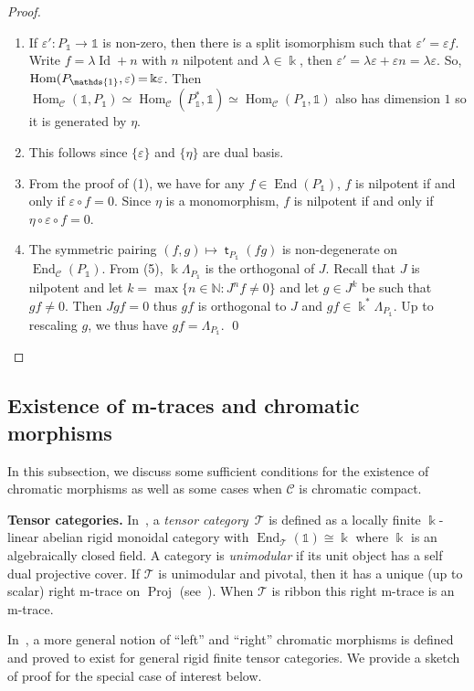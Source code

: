 \documentclass[10pt,a4paper]{amsart}
\numberwithin{equation}{section}
\newcommand{\Proj}{\operatorname{Proj}}
\newcommand{\tto}{\xrightarrow}
\numberwithin{theorem}{section}
\numberwithin{proposition}{section}
\numberwithin{definition}{section}
\numberwithin{lemma}{section}
\numberwithin{corollary}{section}
\numberwithin{remark}{section}
\numberwithin{example}{section}
\newcommand{\cat}{\mathcal{C}}
\newcommand{\ttt}{\mathcal{T}}
\newcommand{\N}{\ensuremath{\mathbb{N}}}
\newcommand{\End}{\operatorname{End}}
\newcommand{\Hom}{\operatorname{Hom}}
\newcommand{\unit}{\ensuremath{\mathds{1}}}
\newcommand{\Id}{\operatorname{Id}}
\newcommand{\FK}{{\Bbbk}}
\newcommand{\ve}{\varepsilon}
\newcommand{\mt}{{\operatorname{\mathsf{t}}}}
\begin{document}
\begin{proof}
\begin{enumerate}
 \item If $\ve'\colon P_\unit\to\unit$ is non-zero, then there is a split
 isomorphism \smash{$P_\unit\tto f P_\unit$} such that ${\ve'=\ve f}$. Write
 $f=\lambda\Id+n$ with $n$ nilpotent and $\lambda\in\FK$, then
 $\ve'=\lambda\ve+\ve n=\lambda\ve$. So,
 ${\Hom(P_\unit,\ve)\hspace{-0.9pt}=\hspace{-0.9pt}\FK\ve}$. Then
 $\Hom_\cat(\unit,P_\unit)\simeq\Hom_\cat(P_\unit^*,\unit)\simeq\Hom_\cat(P_\unit,\unit)$ also
 has dimension $1$ so it is generated by $\eta$.
 \item This follows since $\{\ve\}$ and $\{\eta\}$ are dual basis.
 \item From the proof of (1), we have for any
 $f\in\End(P_\unit)$, $f$ is nilpotent if and only if
 $\ve\circ f=0$. Since $\eta$ is a monomorphism, $f$ is nilpotent
 if and only if $\eta\circ \ve\circ f=0$.
 \item The symmetric pairing $(f,g)\mapsto \mt_{P_\unit}(fg)$ is
 non-degenerate on $\End_\cat(P_\unit)$. From (5),
 $\FK \Lambda_{P_\unit}$ is the orthogonal of $J$. Recall that $J$
 is nilpotent and let $k=\max\{n\in\N:J^nf\neq0\}$ and let
 $g\in J^k$ be such that $gf\neq0$. Then $Jgf=0$ thus $gf$ is
 orthogonal to $J$ and $gf\in\FK^* \Lambda_{P_\unit}$. Up to
 rescaling $g$, we thus have $gf=\Lambda_{P_\unit}$.
\hfill\qed
\end{enumerate}
\renewcommand{\qed}{}
\end{proof}

\subsection{Existence of m-traces and chromatic morphisms}\label{ss:coend}

 In this subsection, we discuss some sufficient conditions for the existence of chromatic morphisms as well as some cases when $\cat$ is chromatic compact.

{\bf Tensor categories.} In~\cite{EGNO}, a \emph{tensor category}~$\ttt$ is defined as a locally
finite $\FK$-linear abelian rigid monoidal category with
$\End_\ttt(\unit)\cong \FK$ where $\FK$ is an algebraically closed
field. A category is \emph{unimodular} if its unit object has a
self dual projective cover. If $\ttt$ is unimodular and pivotal, then
it has a unique (up to scalar) right m-trace on $\Proj$ (see~\cite[Corollary
5.6]{GKP22}). When $\ttt$ is ribbon this right m-trace is an m-trace.

In~\cite{CGPV2023b}, a more general notion of ``left'' and ``right'' chromatic morphisms is defined and proved to exist for general rigid finite tensor categories. We provide a sketch of proof for the special case of interest below.
\end{document}
